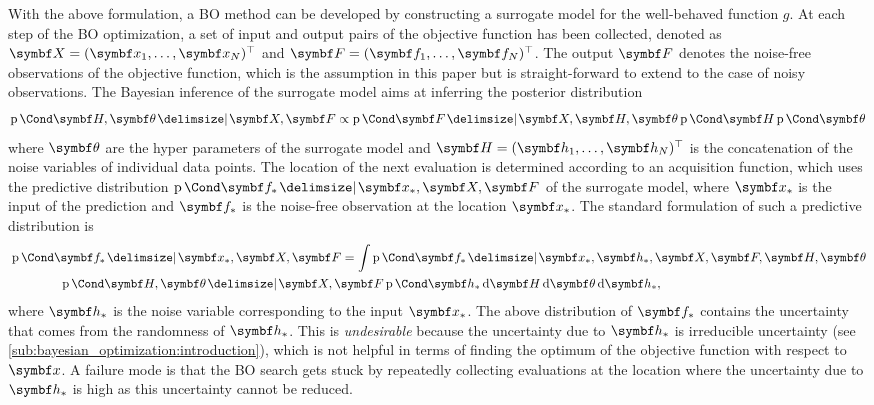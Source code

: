 With the above formulation, a BO method can be developed by constructing a surrogate model for the well-behaved function $g$.
At each step of the BO optimization, a set of input and output pairs of the objective function has been collected, denoted as $\mat{X} = (\mat{x}_1, \ldots, \mat{x}_N)^\top$ and $\mat{F} = (\mat{f}_1, \ldots, \mat{f}_N)^\top$.
The output $\mat{F}$ denotes the noise-free observations of the objective function, which is the assumption in this paper but is straight-forward to extend to the case of noisy observations.
The Bayesian inference of the surrogate model aims at inferring the posterior distribution
\begin{equation}
    \Prob{ \mat{H}, \mat{\theta} \given \mat{X}, \mat{F}}  \propto \Prob{\mat{F} \given \mat{X}, \mat{H}, \mat{\theta} }\Prob{\mat{H}}  \Prob{\mat{\theta}}
\end{equation}
where $\mat{\theta}$ are the hyper parameters of the surrogate model and $\mat{H} = (\mat{h}_1, \ldots, \mat{h}_N)^\top$ is the concatenation of the noise variables of individual data points.
The location of the next evaluation is determined according to an acquisition function,
which uses the predictive distribution $\Prob{\mat{f}_* \given \mat{x}_*,  \mat{X}, \mat{F}}$ of the surrogate model,
where $\mat{x}_*$ is the input of the prediction and $\mat{f}_*$ is the noise-free observation at the location $\mat{x}_*$.
The standard formulation of such a predictive distribution is
\begin{align}
    \begin{split}
        \MoveEqLeft\Prob{\mat{f}_* \given \mat{x}_*,  \mat{X}, \mat{F}} =
        \int \Prob{\mat{f}_* \given \mat{x}_*, \mat{h}_*, \mat{X}, \mat{F},\mat{H}, \mat{\theta}}\\
        &\qquad\Prob{\mat{H}, \mat{\theta} \given \mat{X}, \mat{F}} \Prob{\mat{h}_*} \diff{\mat{H}}\diff{\mat{\theta}}\diff{\mat{h}_*},
    \end{split}
\end{align}
where $\mat{h}_*$ is the noise variable corresponding to the input $\mat{x}_*$.
The above distribution of $\mat{f}_*$ contains the uncertainty that comes from the randomness of $\mat{h}_*$.
This is \textit{undesirable} because the uncertainty due to $\mat{h}_*$ is irreducible uncertainty (see \cref{sub:bayesian_optimization:introduction}), which is not helpful in terms of finding the optimum of the objective function with respect to $\mat{x}$.
A failure mode is that the BO search gets stuck by repeatedly collecting evaluations at the location where the uncertainty due to $\mat{h}_*$ is high as this uncertainty cannot be reduced.
